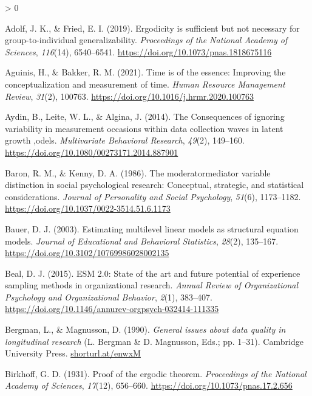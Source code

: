 \documentclass[
12pt, %
twoside,
english]{guelphthesis}
\newlength{\cslhangindent}
\newenvironment{CSLReferences}[2] %
 {%
  \setlength{\parindent}{0pt}
  \ifodd #1 \everypar{\setlength{\hangindent}{\cslhangindent}}\ignorespaces\fi
  \ifnum #2 > 0
  \setlength{\parskip}{\linespacing{2}}
  \fi
 }%
 {}
\theoremstyle{definition}
\theoremstyle{definition}
\theoremstyle{definition}
\theoremstyle{definition}
\theoremstyle{remark}
\begin{document}
\hypertarget{refs}{}
\begin{CSLReferences}{1}{0}
\leavevmode{}%
Adolf, J. K., \& Fried, E. I. (2019). Ergodicity is sufficient but not necessary for group-to-individual generalizability. \emph{Proceedings of the National Academy of Sciences}, \emph{116}(14), 6540--6541. \url{https://doi.org/10.1073/pnas.1818675116}

\leavevmode{}%
Aguinis, H., \& Bakker, R. M. (2021). Time is of the essence: Improving the conceptualization and measurement of time. \emph{Human Resource Management Review}, \emph{31}(2), 100763. \url{https://doi.org/10.1016/j.hrmr.2020.100763}

\leavevmode{}%
Aydin, B., Leite, W. L., \& Algina, J. (2014). The Consequences of ignoring variability in measurement occasions within data collection waves in latent growth ,odels. \emph{Multivariate Behavioral Research}, \emph{49}(2), 149--160. \url{https://doi.org/10.1080/00273171.2014.887901}

\leavevmode{}%
Baron, R. M., \& Kenny, D. A. (1986). The moderator{\textendash}mediator variable distinction in social psychological research: Conceptual, strategic, and statistical considerations. \emph{Journal of Personality and Social Psychology}, \emph{51}(6), 1173--1182. \url{https://doi.org/10.1037/0022-3514.51.6.1173}

\leavevmode{}%
Bauer, D. J. (2003). Estimating multilevel linear models as structural equation models. \emph{Journal of Educational and Behavioral Statistics}, \emph{28}(2), 135--167. \url{https://doi.org/10.3102/10769986028002135}

\leavevmode{}%
Beal, D. J. (2015). ESM 2.0: State of the art and future potential of experience sampling methods in organizational research. \emph{Annual Review of Organizational Psychology and Organizational Behavior}, \emph{2}(1), 383--407. \url{https://doi.org/10.1146/annurev-orgpsych-032414-111335}

\leavevmode{}%
Bergman, L., \& Magnusson, D. (1990). \emph{General issues about data quality in longitudinal research} (L. Bergman \& D. Magnusson, Eds.; pp. 1--31). Cambridge University Press. \href{https://shorturl.at/enwxM}{shorturl.at/enwxM}

\leavevmode{}%
Birkhoff, G. D. (1931). Proof of the ergodic theorem. \emph{Proceedings of the National Academy of Sciences}, \emph{17}(12), 656--660. \url{https://doi.org/10.1073/pnas.17.2.656}


\end{CSLReferences}
\end{document}
